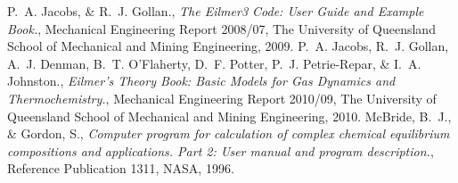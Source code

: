 \documentclass{AIAA}
\begin{document}
\begin{thebibliography}{}
P.~A. Jacobs, \& R.~J. Gollan., {\it The Eilmer3 Code: User Guide and Example Book.}, Mechanical Engineering Report 2008/07, The University of Queensland School of Mechanical and Mining Engineering, 2009.
P.~A. Jacobs, R.~J. Gollan, A.~J. Denman, B.~T. O'Flaherty, D.~F. Potter, P.~J. Petrie-Repar, \& I.~A. Johnston., {\it Eilmer's Theory Book: Basic Models for Gas Dynamics and Thermochemistry.}, Mechanical Engineering Report 2010/09, The University of Queensland School of Mechanical and Mining Engineering, 2010.
McBride, B.~J., \& Gordon, S., {\it Computer program for calculation of complex chemical equilibrium	compositions and applications. Part 2: User manual and program description.}, Reference Publication 1311, NASA, 1996.


\end{thebibliography}
\end{document}
